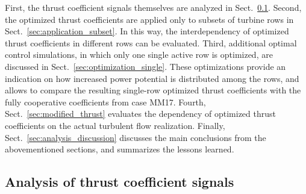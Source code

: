 \documentclass[wes, manuscript]{copernicus}
\begin{document}
First, the thrust coefficient signals themselves are analyzed in Sect.~\ref{sec:analysis_thrust}. Second, the optimized thrust coefficients are applied only to subsets of turbine rows in Sect.~\ref{sec:application_subset}. In this way, the interdependency of optimized thrust coefficients in different rows can be evaluated. Third, additional optimal control simulations, in which only one single active row is optimized, are discussed in Sect.~\ref{sec:optimization_single}. These optimizations provide an indication on how increased power potential is distributed among the rows, and allows to compare the resulting single-row optimized thrust coefficients with the fully cooperative coefficients from case MM17. Fourth, Sect.~\ref{sec:modified_thrust} evaluates the dependency of optimized thrust coefficients on the actual turbulent flow realization. Finally, Sect.~\ref{sec:analysis_discussion} discusses the main conclusions from the abovementioned sections, and summarizes the lessons learned.

\subsection{Analysis of thrust coefficient signals}\label{sec:analysis_thrust}
\end{document}
